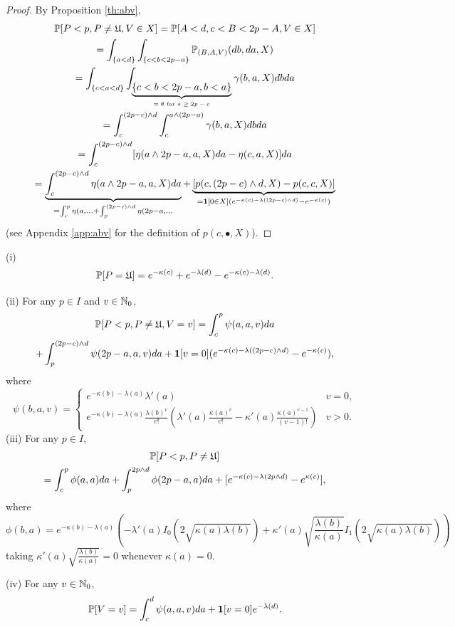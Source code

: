 \documentclass{aptpub}
\begin{document}
\begin{proof}
By Proposition \ref{th:abv}, 
\begin{multline*}
\mathbb{P}[P<p,P\neq\mathfrak{U},V\in X] =\mathbb{P}[A<d,c<B<2p-A,V\in X]
\\ =\int_{\{a < d\}}\int_{\{ c < b < 2p-a\}}\mathbb{P}_{(B,A,V)}(db,da,X)\\
=\int_{\{c< a < d\}}\int_{\underbrace{\{ c < b < 2p-a, b < a \}}_{\text{$=\emptyset$ for $a \geq 2p-c$}}}\gamma(b,a,X)dbda\\
=\int_c^{(2p-c) \wedge d}\int_c^{a \wedge (2p-a)} \gamma(b,a,X)dbda \\
=\int_c^{(2p-c) \wedge d}[ \eta(a \wedge 2p-a,a,X)da - \eta(c,a,X)]da\\
=\underbrace{\int_c^{(2p-c) \wedge d} \eta(a \wedge 2p-a,a,X)da}_
{=\int_c^p \eta(a, {\dots} + \int_p^{(2p-c) \wedge d} \eta(2p-a,\dots} +
\underbrace{\left[p(c,(2p-c) \wedge d,X)-p(c,c,X)\right]}_{=\mathbf{1}[0\in X](e^{-\kappa(c)-\lambda((2p-c) \wedge d)}-e^{-\kappa(c)})}
\end{multline*}
(see Appendix \ref{app:abv} for the definition of $p(c,\bullet,X)$).
\end{proof}

\begin{theorem}
(i)
$$
\mathbb{P}[P=\mathfrak{U}]=e^{-\kappa(c)}+e^{-\lambda(d)}-e^{-\kappa(c)-\lambda(d)}.
$$

\noindent (ii) For any $p\in I$ and $v \in \mathbb{N}_0$,
\begin{multline}
\mathbb{P}[P<p,P\neq\mathfrak{U},V = v]=
\int_{c}^{p}\psi(a,a,v)da \\ +\int_{p}^{(2p-c) \wedge d}\psi(2p-a,a,v)da+\mathbf{1}[v=0] (e^{-\kappa(c)-\lambda((2p-c) \wedge d)}-e^{-\kappa(c)}),
\label{eq:pdist2}
\end{multline}
where
$$
\psi(b,a,v)=
\begin{cases}
e^{-\kappa(b)-\lambda(a)}\lambda'(a) & v=0,\\
e^{-\kappa(b)-\lambda(a)}\frac{\lambda(b)^v}{v!}\left(\lambda'(a)\frac{\kappa(a)^v}{v!}
- \kappa'(a)\frac{\kappa(a)^{v-1}}{{(v-1)}!}\right) & v>0.
\end{cases}
$$
\noindent (iii) For any $p \in I$,
\begin{multline}
\mathbb{P}[P<p,P\neq\mathfrak{U}]\\=
\int_{c}^{p}\phi(a,a)da+\int_{p}^{2p \wedge d}\phi(2p-a,a)da + [e^{-\kappa(c)-\lambda(2p \wedge d)}-e^{\kappa(c)}],
\label{eq:ppu}
\end{multline}
where 
$$
\phi(b,a)=
e^{-\kappa(b)-\lambda(a)}\left(-\lambda'(a)I_0(2\sqrt{\kappa(a)\lambda(b)})+\kappa'(a)\sqrt{\frac{\lambda(b)}{\kappa(a)}}I_1(2\sqrt{\kappa(a)\lambda(b)})\right)
$$
taking $\kappa'(a)\sqrt{\frac{\lambda(b)}{\kappa(a)}}=0$ whenever $\kappa(a)=0$.

\noindent (iv) For any $v\in \mathbb{N}_0$,
$$
\mathbb{P}[V=v]\\=
\int_{c}^{d}\psi(a,a,v)da + \mathbf{1}[v = 0] e^{-\lambda(d)}.
$$
\end{theorem}
\end{document}
